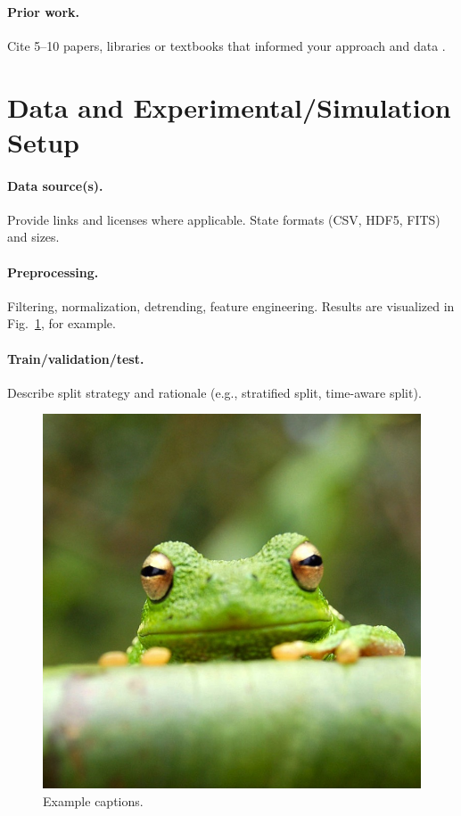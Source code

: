 \documentclass[reprint, superscriptaddress, aps]{revtex4-2}
\begin{document}
\paragraph*{Prior work.} Cite 5--10 papers, libraries or textbooks that informed your approach and data \cite{greenwade93,savvidis_resonant_2004,waschke_coherent_1993}.


\section{Data and Experimental/Simulation Setup}

\paragraph*{Data source(s).} Provide links and licenses where applicable. State formats (CSV, HDF5, FITS) and sizes.

\paragraph*{Preprocessing.} Filtering, normalization, detrending, feature engineering. Results are visualized in Fig.~\ref{fig:data}, for example.

\paragraph*{Train/validation/test.} Describe split strategy and rationale (e.g., stratified split, time-aware split).

\begin{figure}[h]
  \centering
  \includegraphics[width=\linewidth]{frog.jpg}
  \caption{Example captions.}
  \label{fig:data}
\end{figure}
\end{document}
